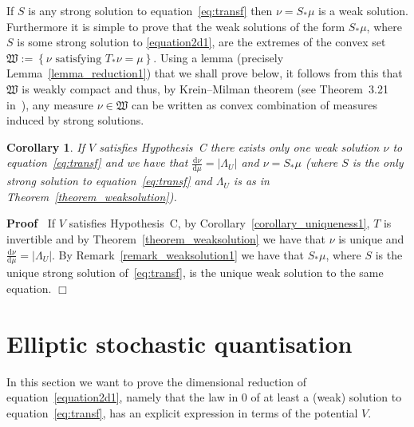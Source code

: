 \documentclass[a4paper,10pt]{article}
\newcommand{\assign}{:=}
\newcommand{\asterisk}{\mathord{*}}
\newcommand{\mathd}{\mathrm{d}}
\newenvironment{proof}{\noindent\textbf{Proof\ }}{\hspace*{\fill}$\Box$\medskip}
\newtheorem{corollary}{Corollary}
\begin{document}
\begin{remark}
  \label{remark_weaksolution1}If $S$ is any strong solution to
  equation~{\eqref{eq:transf}} then $\nu = S_{\asterisk} \mu$ is a weak
  solution. Furthermore it is simple to prove that the weak solutions of the
  form $S_{\asterisk} \mu$, where $S$ is some strong solution to
  {\eqref{equation2d1}}, are the extremes of the convex set $\mathfrak{W}
  \assign \left\{ \text{$\nu$ satisfying $T_{\asterisk} \nu = \mu$} \right\}$.
  Using a lemma (precisely Lemma~\ref{lemma_reduction1}) that we shall prove
  below, it follows from this that $\mathfrak{W}$ is weakly compact and thus,
  by Krein--Milman theorem (see Theorem~3.21 in~{\cite{Rudin1973}}), any
  measure $\nu \in \mathfrak{W}$ can be written as convex combination of
  measures induced by strong solutions. \ 
\end{remark}

\begin{corollary}
  \label{corollary_uniqueness2}If $V$ satisfies Hypothesis~C there exists only
  one weak solution $\nu$ to equation~{\eqref{eq:transf}} and we have that
  $\frac{\mathd \nu}{\mathd \mu} = | \Lambda_U |$ and $\nu = S_{\asterisk}
  \mu$ (where $S$ is the only strong solution to equation~{\eqref{eq:transf}}
  and $\Lambda_U$ is as in Theorem~\ref{theorem_weaksolution}).
\end{corollary}

\begin{proof}
  If $V$ satisfies Hypothesis~C, by Corollary~\ref{corollary_uniqueness1}, $T$
  is invertible and by Theorem~\ref{theorem_weaksolution} we have that $\nu$
  is unique and $\frac{\mathd \nu}{\mathd \mu} = | \Lambda_U | .$ By
  Remark~\ref{remark_weaksolution1} we have that $S_{\asterisk} \mu$, where
  $S$ is the unique strong solution of~{\eqref{eq:transf}}, is the unique weak
  solution to the same equation.
\end{proof}

\section{Elliptic stochastic quantisation}\label{sec:dim-red}

In this section we want to prove the dimensional reduction of
equation~{\eqref{equation2d1}}, namely that the law in 0 of at least a (weak)
solution to equation~{\eqref{eq:transf}}, has an explicit expression in terms
of the potential $V$.
\end{document}
